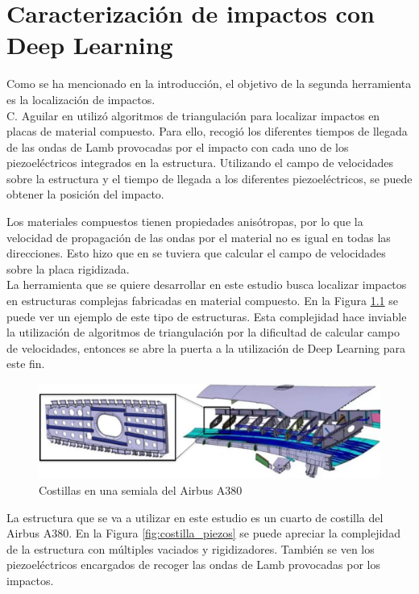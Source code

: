 \chapter{Caracterización de impactos con Deep Learning}

Como se ha mencionado en la introducción, el objetivo de la segunda herramienta es la localización de impactos.\\

C. Aguilar en \cite{Christian_TFM} utilizó algoritmos de triangulación para localizar impactos en placas de material compuesto. Para ello, recogió los diferentes tiempos de llegada de las ondas de Lamb provocadas por el impacto con cada uno de los piezoeléctricos integrados en la estructura. Utilizando el campo de velocidades sobre la estructura y el tiempo de llegada a los diferentes piezoeléctricos, se puede obtener la posición del impacto. 

Los materiales compuestos tienen propiedades anisótropas, por lo que la velocidad de propagación de las ondas por el material no es igual en todas las direcciones. Esto hizo que en \cite{Christian_TFM} se tuviera que calcular el campo de velocidades sobre la placa rigidizada.\\

La herramienta que se quiere desarrollar en este estudio busca localizar impactos en estructuras complejas fabricadas en material compuesto. En la Figura \ref{fig:costilla_ala} se puede ver un ejemplo de este tipo de estructuras. Esta complejidad hace inviable la utilización de algoritmos de triangulación por la dificultad de calcular campo de velocidades, entonces se abre la puerta a la utilización de Deep Learning para este fin.

\begin{figure}[h!]
    \centering
    \includegraphics[width=135mm, angle=0]{4/Fotos/costilla_ala.png}
    \captionsetup{justification=centering,margin=1.25cm}
    \caption{Costillas en una semiala del Airbus A380}
    \label{fig:costilla_ala}
\end{figure}

La estructura que se va a utilizar en este estudio es un cuarto de costilla del Airbus A380. En la Figura \ref{fig:costilla_piezos} se puede apreciar la complejidad de la estructura con múltiples vaciados y rigidizadores. También se ven los piezoeléctricos encargados de recoger las ondas de Lamb provocadas por los impactos.\\

